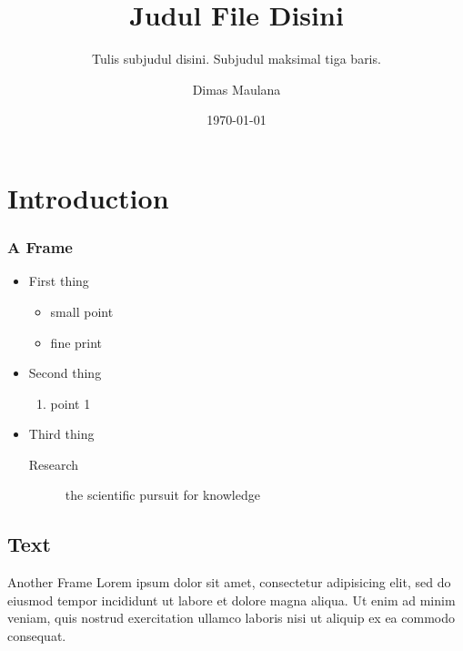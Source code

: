 \documentclass[10pt,aspectratio=169]{beamer}
\title{Judul File Disini}
\subtitle{Tulis subjudul disini. Subjudul maksimal tiga baris.}
\author{Dimas Maulana}
\date{\today}
\institute{Program Studi Sarjana Sains Aktuaria}
\begin{document}
\begin{frame}[plain]
	\titlepage
\end{frame}

\section{Introduction}
\begin{frame}
	\frametitle{A Frame}
\begin{itemize}
\item First thing
	\begin{itemize}
	\item small point
	\item fine print
	\end{itemize}
\item Second thing
	\begin{enumerate}
	\item point 1
	\end{enumerate}
\item Third thing
	\begin{description}
	\item[Research] the scientific pursuit for knowledge
	\end{description}
\end{itemize}
\end{frame}

\subsection{Text}
\begin{frame}{Another Frame}
Lorem ipsum dolor sit amet, consectetur adipisicing elit, sed do eiusmod tempor incididunt ut labore et dolore magna aliqua. Ut enim ad minim veniam, quis nostrud exercitation ullamco laboris nisi ut aliquip ex ea commodo consequat.
\end{frame}
\end{document}
